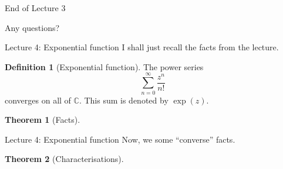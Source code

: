 \documentclass[handout, dvipsnames]{beamer}
\theoremstyle{definition}
\newtheorem{defn}{Definition}
\newtheorem{thm}{Theorem}
\begin{document}
\begin{frame}{End of Lecture 3}
    \begin{tcolorbox}
        Any questions?
    \end{tcolorbox}
\end{frame}

\begin{frame}{Lecture 4: Exponential function}
    I shall just recall the facts from the lecture.
    \begin{defn}[Exponential function]
        The power series
        \begin{equation*} 
            \sum_{n = 0}^{\infty}\dfrac{z^n}{n!}
        \end{equation*}
        converges on all of $\mathbb{C}.$ This sum is denoted by $\exp(z).$
    \end{defn}
    \begin{thm}[Facts]
        \begin{enumerate}
        \end{enumerate}
    \end{thm}
\end{frame}
\begin{frame}{Lecture 4: Exponential function}
    Now, we some ``converse'' facts.
    \begin{thm}[Characterisations]
        \begin{enumerate}
        \end{enumerate}
    \end{thm}
\end{frame}
\end{document}
